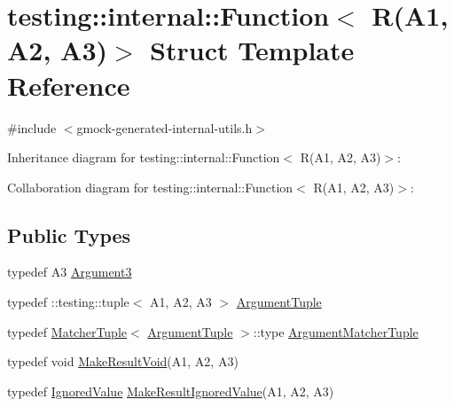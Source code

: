\hypertarget{structtesting_1_1internal_1_1_function_3_01_r_07_a1_00_01_a2_00_01_a3_08_4}{}\section{testing\+:\+:internal\+:\+:Function$<$ R(A1, A2, A3)$>$ Struct Template Reference}
\label{structtesting_1_1internal_1_1_function_3_01_r_07_a1_00_01_a2_00_01_a3_08_4}


{\ttfamily \#include $<$gmock-\/generated-\/internal-\/utils.\+h$>$}



Inheritance diagram for testing\+:\+:internal\+:\+:Function$<$ R(A1, A2, A3)$>$\+:


Collaboration diagram for testing\+:\+:internal\+:\+:Function$<$ R(A1, A2, A3)$>$\+:
\subsection*{Public Types}
\begin{DoxyCompactItemize}
\item 
typedef A3 \hyperlink{structtesting_1_1internal_1_1_function_3_01_r_07_a1_00_01_a2_00_01_a3_08_4_a2ac6eefb33feafe85c1c6742bdab509f}{Argument3}
\item 
typedef \+::testing\+::tuple$<$ A1, A2, A3 $>$ \hyperlink{structtesting_1_1internal_1_1_function_3_01_r_07_a1_00_01_a2_00_01_a3_08_4_a6f1e1097947a9e13a4e29099a61de804}{Argument\+Tuple}
\item 
typedef \hyperlink{structtesting_1_1internal_1_1_matcher_tuple}{Matcher\+Tuple}$<$ \hyperlink{structtesting_1_1internal_1_1_function_3_01_r_07_08_4_ad483c3128c470d8cdb55c3ac1c575c11}{Argument\+Tuple} $>$\+::type \hyperlink{structtesting_1_1internal_1_1_function_3_01_r_07_a1_00_01_a2_00_01_a3_08_4_acb08fa0fffe1213ce88f53343bb3b564}{Argument\+Matcher\+Tuple}
\item 
typedef void \hyperlink{structtesting_1_1internal_1_1_function_3_01_r_07_a1_00_01_a2_00_01_a3_08_4_a6b9f583a9ef6755cc92ce2b7fa255b84}{Make\+Result\+Void}(A1, A2, A3)
\item 
typedef \hyperlink{classtesting_1_1internal_1_1_ignored_value}{Ignored\+Value} \hyperlink{structtesting_1_1internal_1_1_function_3_01_r_07_a1_00_01_a2_00_01_a3_08_4_abff7468ae8231766e7b396c8a407cb5a}{Make\+Result\+Ignored\+Value}(A1, A2, A3)
\end{DoxyCompactItemize}


